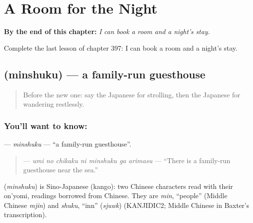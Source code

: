 
\chapter{A Room for the Night}
\label{ch:ja-a-room-for-the-night}

\begin{chapteropening}
\textbf{By the end of this chapter:} \emph{I can book a room and a night's stay.}

Complete the last lesson of chapter 397: I can book a room and a night's stay.
\end{chapteropening}

\section[\texorpdfstring{\ja{みんしゅく} (minshuku)}{みんしゅく (minshuku)}]{ (minshuku) — a family-run guesthouse}

\label{lesson:JA-C397-minshuku}



\begin{quote}
Before the new one: say the Japanese for strolling, then the Japanese for wandering restlessly.
\end{quote}

\subsection*{You'll want to know: }
\textbf{} — \emph{minshuku} — \textquotedblleft{}a family-run guesthouse\textquotedblright{}.

\begin{quote}
\textbf{   } — \emph{umi no chikaku ni minshuku ga arimasu} — \textquotedblleft{}There is a family-run guesthouse near the sea.\textquotedblright{}
\end{quote}

\begin{cousinweb}
\textbf{} (\emph{minshuku}) is Sino-Japanese (kango): two Chinese characters read with their on'yomi, readings borrowed from Chinese. They are \emph{min}, \textquotedblleft{}people\textquotedblright{} (Middle Chinese \emph{mjin}) and \emph{shuku}, \textquotedblleft{}inn\textquotedblright{} (\emph{sjuwk}) (KANJIDIC2; Middle Chinese in Baxter's transcription).
\end{cousinweb}


